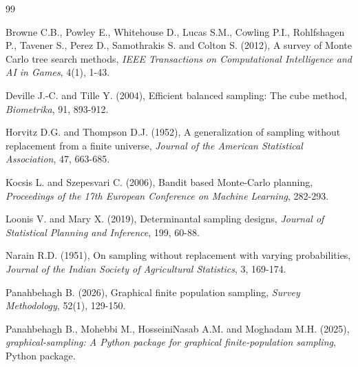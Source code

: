 \documentclass[twoside]{article}
\begin{document}
\begin{thebibliography}{99}

Browne C.B., Powley E., Whitehouse D., Lucas S.M., Cowling P.I., Rohlfshagen P., Tavener S., Perez D., Samothrakis S. and Colton S. (2012), A survey of Monte Carlo tree search methods, {\it IEEE Transactions on Computational Intelligence and AI in Games}, 4(1), 1-43.

Deville J.-C. and Tille Y. (2004), Efficient balanced sampling: The cube method, {\it Biometrika}, 91, 893-912.

Horvitz D.G. and Thompson D.J. (1952), A generalization of sampling without replacement from a finite universe, {\it Journal of the American Statistical Association}, 47, 663-685.

Kocsis L. and Szepesvari C. (2006), Bandit based Monte-Carlo planning, {\it Proceedings of the 17th European Conference on Machine Learning}, 282-293.

Loonis V. and Mary X. (2019), Determinantal sampling designs, {\it Journal of Statistical Planning and Inference}, 199, 60-88.

Narain R.D. (1951), On sampling without replacement with varying probabilities, {\it Journal of the Indian Society of Agricultural Statistics}, 3, 169-174.

Panahbehagh B. (2026), Graphical finite population sampling, {\it Survey Methodology}, 52(1), 129-150.

Panahbehagh B., Mohebbi M., HosseiniNasab A.M. and Moghadam M.H. (2025), {\it graphical-sampling: A Python package for graphical finite-population sampling}, Python package.

\end{thebibliography}
\end{document}
